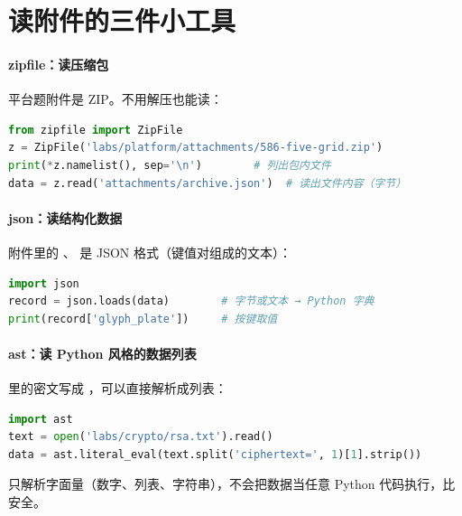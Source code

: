 \documentclass[UTF8,12pt,oneside]{ctexbook}
\begin{document}
\section{读附件的三件小工具}
\paragraph{zipfile：读压缩包}平台题附件是 ZIP。不用解压也能读：
\begin{lstlisting}[language=Python]
from zipfile import ZipFile
z = ZipFile('labs/platform/attachments/586-five-grid.zip')
print(*z.namelist(), sep='\n')        # 列出包内文件
data = z.read('attachments/archive.json')  # 读出文件内容（字节）
\end{lstlisting}

\paragraph{json：读结构化数据}附件里的 、 是 JSON 格式（键值对组成的文本）：
\begin{lstlisting}[language=Python]
import json
record = json.loads(data)        # 字节或文本 → Python 字典
print(record['glyph_plate'])     # 按键取值
\end{lstlisting}

\paragraph{ast：读 Python 风格的数据列表} 里的密文写成 ，可以直接解析成列表：
\begin{lstlisting}[language=Python]
import ast
text = open('labs/crypto/rsa.txt').read()
data = ast.literal_eval(text.split('ciphertext=', 1)[1].strip())
\end{lstlisting}
 只解析字面量（数字、列表、字符串），不会把数据当任意 Python 代码执行，比  安全。
\end{document}
